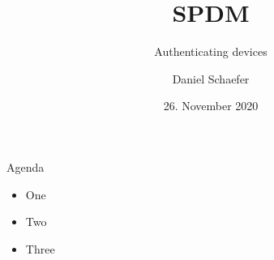\documentclass[
  10pt
]{beamer}
\title{SPDM}
\subtitle{Authenticating devices}
\date{26. November 2020}
\author{Daniel Schaefer}
\begin{document}
\maketitle

\begin{frame}{Agenda}
  \begin{itemize}
    \item One
    \item Two
    \item Three
  \end{itemize}
\end{frame}
\end{document}
